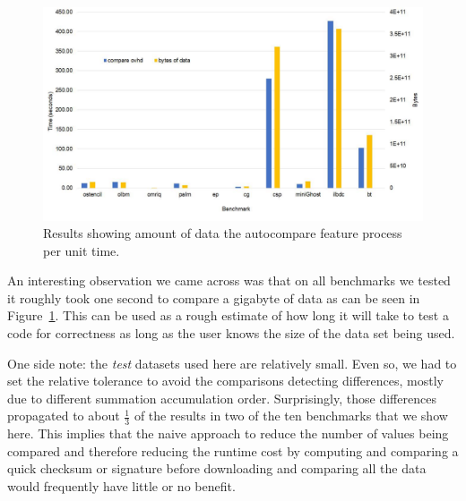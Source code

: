 \begin{figure}[ht]
    \centering
    \includegraphics [width=1\linewidth] {GBperSec.pdf}
    \caption{Results showing amount of data the autocompare feature process per unit time.}
    \label{fig:gbps_figure}
\end{figure}


An interesting observation we came across was that on all benchmarks we tested it roughly took one second to compare a gigabyte of data as can be seen in Figure~\ref{fig:gbps_figure}.
This can be used as a rough estimate of how long it will take to test a code for correctness as long as the user knows the size of the data set being used.


One side note: the \emph{test} datasets used here are relatively small.
Even so, we had to set the relative tolerance to avoid the comparisons detecting differences, mostly due to different summation accumulation order.
Surprisingly, those differences propagated to about $\frac{1}{3}$ of the results in two of the ten benchmarks that we show here.
This implies that the naive approach to reduce the number of values being compared and therefore reducing the runtime cost by computing and comparing a quick checksum or signature before downloading and comparing all the data would frequently have little or no benefit.
